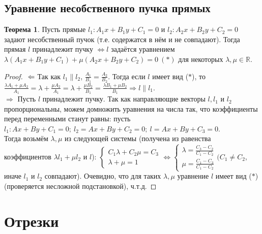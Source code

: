 \documentclass[a4paper, 12pt]{article}
\theoremstyle{definition}
\newtheorem*{theorem}{Теорема}
\begin{document}
	\subsection{Уравнение несобственного пучка прямых}
	\begin{theorem}
		Пусть прямые $l_{1}: A_{1}x + B_{1}y + C_{1} = 0$ и $l_{2}: A_{2}x + B_{2}y + C_{2} = 0$ задают несобственный пучок (т.е. содержатся в нём и не совпадают). Тогда прямая $l$ принадлежит пучку $\Leftrightarrow l$ задаётся уравнением $\lambda(A_{1}x + B_{1}y + C_{1}) + \mu(A_{2}x + B_{2}y + C_{2}) = 0 \ (*)$ для некоторых $\lambda, \mu \in \mathbb{R}$.
	\end{theorem}
	\begin{proof}
		$\\\Leftarrow$ Так как $l_{1} \parallel l_{2}$, $\frac{A_{1}}{B_{1}} = \frac{A_{2}}{B_{2}}$. Тогда если $l$ имеет вид ($*$), то $\frac{\lambda A_{1}+\mu A_{2}}{A_{1}} = \lambda + \frac{\mu A_{2}}{A_{1}} = \lambda + \frac{\mu B_{2}}{B_{1}} = \frac{\lambda B_{1}+\mu B_{2}}{B_{1}} \Rightarrow l \parallel l_{1}$.\\
		$\Rightarrow$ Пусть $l$ принадлежит пучку. Так как направляющие векторы $l, l_{1}$ и $l_{2}$ пропорциональны, можем домножить уравнения на числа так, что коэффициенты перед переменными станут равны: пусть $l_{1}: Ax + By + C_{1} = 0; \ l_{2} = Ax + By + C_{2} = 0; \ l = Ax + By + C_{3} = 0$. \\Тогда возьмём $\lambda, \mu$ из следующей системы (получена из равенства коэффициентов $\lambda l_1 + \mu l_2$ и $l$): $\begin{cases}C_{1}\lambda + C_{2}\mu = C_{3}\\\lambda + \mu = 1\end{cases} \Leftrightarrow \begin{cases}\lambda = \frac{C_{3}-C_{2}}{C_{1}-C_{2}}\\\mu = \frac{C_{1} - C_{3}}{C_{1} - C_{2}}\end{cases} (C_{1} \neq C_{2}$, иначе $l_{1}$ и $l_{2}$ совпадают). Очевидно, что для таких $\lambda, \mu$ уравнение $l$ имеет вид ($*$) (проверяется несложной подстановкой), ч.т.д.
	\end{proof}
	\section{Отрезки}
\end{document}
